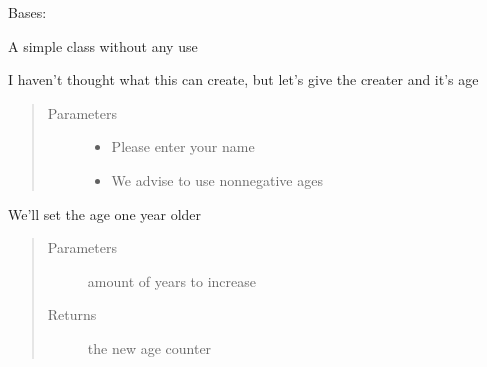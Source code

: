 \documentclass[letterpaper,10pt,english]{sphinxmanual}
\begin{document}
\begin{fulllineitems}
\label{\detokenize{laurens:laurens.hello.Hello}}
Bases: 

A simple class without any use

I haven’t thought what this can create, but let’s give the creater and it’s age
\begin{quote}\begin{description}
\item[{Parameters}] \leavevmode\begin{itemize}
\item {} 
 \textendash{} Please enter your name

\item {} 
 \textendash{} We advise to use non\sphinxhyphen{}negative ages

\end{itemize}

\end{description}\end{quote}

\begin{fulllineitems}
\label{\detokenize{laurens:laurens.hello.Hello.get_older}}
We’ll set the age one year older
\begin{quote}\begin{description}
\item[{Parameters}] \leavevmode
{} \textendash{} amount of years to increase

\item[{Returns}] \leavevmode
the new age counter

\end{description}\end{quote}

\end{fulllineitems}


\end{fulllineitems}
\end{document}
